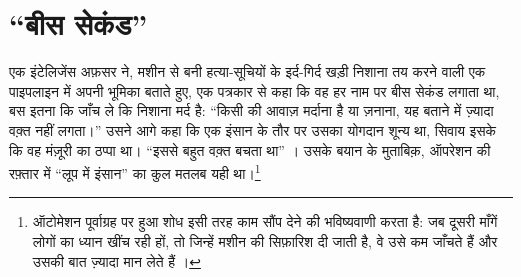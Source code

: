 \chapter{“बीस सेकंड”}
\label{sec:1}
एक इंटेलिजेंस अफ़सर ने, मशीन से बनी हत्या-सूचियों के इर्द-गिर्द खड़ी निशाना तय करने वाली एक पाइपलाइन में अपनी भूमिका बताते हुए, एक पत्रकार से कहा कि वह हर नाम पर बीस सेकंड लगाता था, बस इतना कि जाँच ले कि निशाना मर्द है: “किसी की आवाज़ मर्दाना है या ज़नाना, यह बताने में ज़्यादा वक़्त नहीं लगता।” उसने आगे कहा कि एक इंसान के तौर पर उसका योगदान शून्य था, सिवाय इसके कि वह मंज़ूरी का ठप्पा था। “इससे बहुत वक़्त बचता था” \autocite{abraham2024lavender}। उसके बयान के मुताबिक़, ऑपरेशन की रफ़्तार में “लूप में इंसान” का कुल मतलब यही था।\footnote{ऑटोमेशन पूर्वाग्रह पर हुआ शोध इसी तरह काम सौंप देने की भविष्यवाणी करता है: जब दूसरी माँगें लोगों का ध्यान खींच रही हों, तो जिन्हें मशीन की सिफ़ारिश दी जाती है, वे उसे कम जाँचते हैं और उसकी बात ज़्यादा मान लेते हैं \autocite{parasuraman2010complacency}।}

